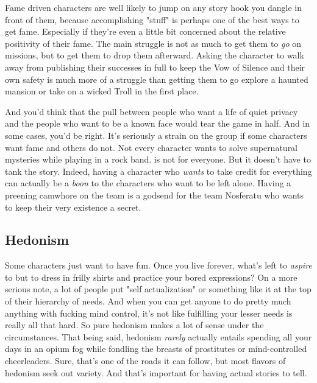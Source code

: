 Fame driven characters are well likely to jump on any story hook you dangle in front of them, because accomplishing "stuff" is perhaps one of the best ways to get fame. Especially if they're even a little bit concerned about the relative positivity of their fame. The main struggle is not as much to get them to \textit{go} on missions, but to get them to drop them afterward. Asking the character to walk away from publishing their successes in full to keep the Vow of Silence and their own safety is much more of a struggle than getting them to go explore a haunted mansion or take on a wicked Troll in the first place.

And you'd think that the pull between people who want a life of quiet privacy and the people who want to be a known face would tear the game in half. And in some cases, you'd be right. It's seriously a strain on the group if some characters want fame and others do not. Not every character wants to solve supernatural mysteries while playing in a rock band.  is not for everyone. But it doesn't have to tank the story. Indeed, having a character who \textit{wants} to take credit for everything can actually be a \textit{boon} to the characters who want to be left alone. Having a preening camwhore on the team is a godsend for the team Nosferatu who wants to keep their very existence a secret.

\subsection{Hedonism}

Some characters just want to have fun. Once you live forever, what's left to \textit{aspire} to but to dress in frilly shirts and practice your bored expressions? On a more serious note, a lot of people put "self actualization" or something like it at the top of their hierarchy of needs. And when you can get anyone to do pretty much anything with fucking mind control, it's not like fulfilling your lesser needs is really all that hard. So pure hedonism makes a lot of sense under the circumstances. That being said, hedonism \textit{rarely} actually entails spending all your days in an opium fog while fondling the breasts of prostitutes or mind-controlled cheerleaders. Sure, that's one of the roads it can follow, but most flavors of hedonism seek out variety. And that's important for having actual stories to tell.

